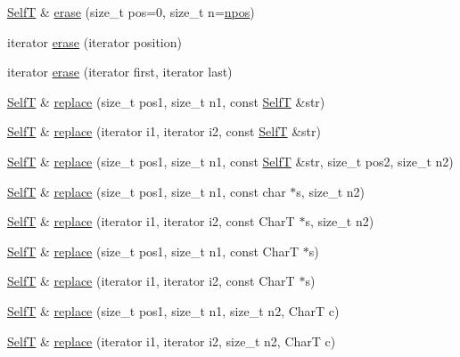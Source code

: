 \begin{CompactItemize}
\item 
\hyperlink{classdeque__string}{SelfT} \& \hyperlink{classdeque__string_2c63c675c2fad7c5c3dd2e602e910d95}{erase} (size\_\-t pos=0, size\_\-t n=\hyperlink{classdeque__string_b2a5692bbdd473486ce93df0cadd2540}{npos})
\item 
iterator \hyperlink{classdeque__string_64f3c87f7723580db6d3faa52d61cdbc}{erase} (iterator position)
\item 
iterator \hyperlink{classdeque__string_9433d1f64823bcc7f8bced8ab357bf51}{erase} (iterator first, iterator last)
\item 
\hyperlink{classdeque__string}{SelfT} \& \hyperlink{classdeque__string_d2e8ac524c0f6ad26297ef056f015688}{replace} (size\_\-t pos1, size\_\-t n1, const \hyperlink{classdeque__string}{SelfT} \&str)
\item 
\hyperlink{classdeque__string}{SelfT} \& \hyperlink{classdeque__string_39ecf1ddad7e060513fdc9737ff3893a}{replace} (iterator i1, iterator i2, const \hyperlink{classdeque__string}{SelfT} \&str)
\item 
\hyperlink{classdeque__string}{SelfT} \& \hyperlink{classdeque__string_a80041a6c719e9ec64004af372ae17af}{replace} (size\_\-t pos1, size\_\-t n1, const \hyperlink{classdeque__string}{SelfT} \&str, size\_\-t pos2, size\_\-t n2)
\item 
\hyperlink{classdeque__string}{SelfT} \& \hyperlink{classdeque__string_2d20e57466d40ab0b5605ca7c296c99f}{replace} (size\_\-t pos1, size\_\-t n1, const char $\ast$s, size\_\-t n2)
\item 
\hyperlink{classdeque__string}{SelfT} \& \hyperlink{classdeque__string_c69d24bbf034ed9ed36b29ced416eea4}{replace} (iterator i1, iterator i2, const CharT $\ast$s, size\_\-t n2)
\item 
\hyperlink{classdeque__string}{SelfT} \& \hyperlink{classdeque__string_bd1b08c6f2c1c0c77d8a64a56ebe2a09}{replace} (size\_\-t pos1, size\_\-t n1, const CharT $\ast$s)
\item 
\hyperlink{classdeque__string}{SelfT} \& \hyperlink{classdeque__string_4ce63da89c419a5a03d1661ac5328f0c}{replace} (iterator i1, iterator i2, const CharT $\ast$s)
\item 
\hyperlink{classdeque__string}{SelfT} \& \hyperlink{classdeque__string_25e331d55a7113b19422c129816ff428}{replace} (size\_\-t pos1, size\_\-t n1, size\_\-t n2, CharT c)
\item 
\hyperlink{classdeque__string}{SelfT} \& \hyperlink{classdeque__string_798d6054dc0ae68df66899275d199c31}{replace} (iterator i1, iterator i2, size\_\-t n2, CharT c)

\end{CompactItemize}
